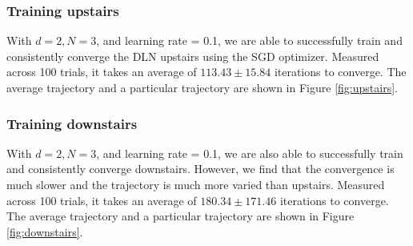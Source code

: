 \documentclass[11pt]{article}
\begin{document}
\subsubsection{Training upstairs}
With $d = 2, N = 3$, and learning rate = 0.1, we are able to successfully train and consistently converge the DLN upstairs using the SGD optimizer. Measured across 100 trials, it takes an average of $113.43 \pm 15.84$ iterations to converge. The average trajectory and a particular trajectory are shown in Figure \ref{fig:upstairs}.

\subsubsection{Training downstairs}
With $d = 2, N = 3$, and learning rate = 0.1, we are also able to successfully train and consistently converge downstairs. However, we find that the convergence is much slower and the trajectory is much more varied than upstairs. Measured across 100 trials, it takes an average of $180.34 \pm 171.46$ iterations to converge. The average trajectory and a particular trajectory are shown in Figure \ref{fig:downstairs}.
\end{document}
